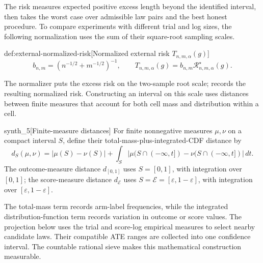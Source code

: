 \documentclass[11pt]{article}
\begin{document}
The risk  measures expected positive excess length beyond the identified interval, then takes the worst case over admissible law pairs and the best honest procedure. To compare experiments with different trial and log sizes, the following normalization uses the sum of their square-root sampling scales.

\begin{definitionv}{def:external-normalized-risk}[Normalized external risk $T_{n,m,\alpha}(g)$]
\[
b_{n,m}=\left(n^{-1/2}+m^{-1/2}\right)^{-1},
\qquad
T_{n,m,\alpha}(g)=b_{n,m}\mathcal R^{\star}_{n,m,\alpha}(g).
\]
\end{definitionv}

The normalizer  puts the excess risk on the two-sample root scale;  records the resulting normalized risk. Constructing an interval on this scale uses distances between finite measures that account for both cell mass and distribution within a cell.

\begin{definitionv}{synth_5}[Finite-measure distances]
For finite nonnegative measures \(\mu,\nu\) on a compact interval \(S\), define their total-mass-plus-integrated-CDF distance by
\[
d_S(\mu,\nu)
=
|\mu(S)-\nu(S)|
+
\int_S
\bigl|\mu(S\cap(-\infty,t])-\nu(S\cap(-\infty,t])\bigr|\,dt.
\]
The outcome-measure distance \(d_{[0,1]}\) uses \(S=[0,1]\), with integration over \([0,1]\); the score-measure distance \(d_{\mathcal E}\) uses \(S=\mathcal E=[\varepsilon,1-\varepsilon]\), with integration over \([\varepsilon,1-\varepsilon]\).
\end{definitionv}

The total-mass term records arm-label frequencies, while the integrated distribution-function term records variation in outcome or score values. The projection below uses the trial and score-log empirical measures to select nearby candidate laws. Their compatible ATE ranges are collected into one confidence interval. The countable rational sieve makes this mathematical construction measurable.
\end{document}
